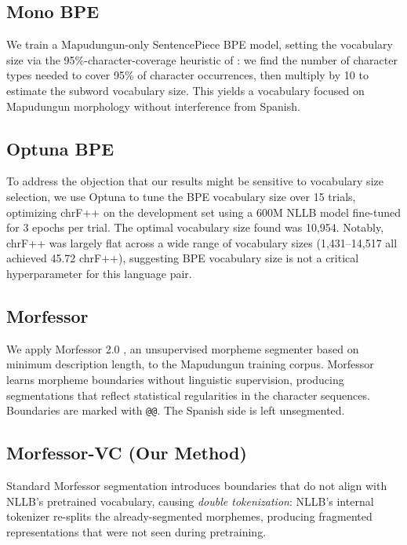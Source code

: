 \documentclass[11pt]{article}
\begin{document}
\subsection{Mono BPE}

We train a Mapudungun-only SentencePiece BPE model, setting the vocabulary size via the 95\%-character-coverage heuristic of \citet{gowda2020finding}: we find the number of character types needed to cover 95\% of character occurrences, then multiply by 10 to estimate the subword vocabulary size. This yields a vocabulary focused on Mapudungun morphology without interference from Spanish.

\subsection{Optuna BPE}

To address the objection that our results might be sensitive to vocabulary size selection, we use Optuna \cite{akiba2019optuna} to tune the BPE vocabulary size over 15 trials, optimizing chrF++ on the development set using a 600M NLLB model fine-tuned for 3 epochs per trial. The optimal vocabulary size found was 10,954. Notably, chrF++ was largely flat across a wide range of vocabulary sizes (1,431--14,517 all achieved 45.72 chrF++), suggesting BPE vocabulary size is not a critical hyperparameter for this language pair.

\subsection{Morfessor}

We apply Morfessor 2.0 \cite{virpioja2013morfessor}, an unsupervised morpheme segmenter based on minimum description length, to the Mapudungun training corpus. Morfessor learns morpheme boundaries without linguistic supervision, producing segmentations that reflect statistical regularities in the character sequences. Boundaries are marked with \texttt{@@}. The Spanish side is left unsegmented.

\subsection{Morfessor-VC (Our Method)}
\label{sec:morfessor-vc}

Standard Morfessor segmentation introduces boundaries that do not align with NLLB's pretrained vocabulary, causing \textit{double tokenization}: NLLB's internal tokenizer re-splits the already-segmented morphemes, producing fragmented representations that were not seen during pretraining.
\end{document}
